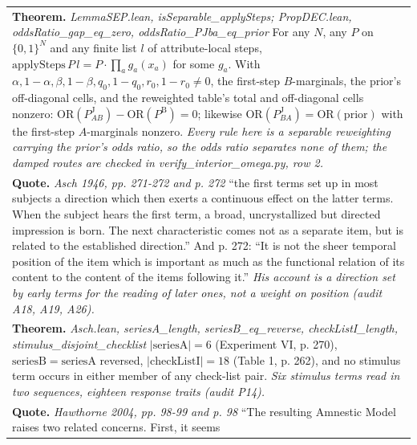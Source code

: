 \documentclass[10pt]{article}
\theoremstyle{definition}
\newcommand{\PB}{P^{\mathrm{B}}}
\newcommand{\PJ}{P^{\mathrm{J}}}
\newlength{\fullw}\setlength{\fullw}{25.9cm}
\begin{document}
{\begin{longtable}{|p{0.9cm}|p{12.2cm}|p{12.2cm}|}
\multicolumn{3}{|p{\fullw}|}{\textbf{Theorem.} \textit{LemmaSEP.lean, isSeparable\_applySteps; PropDEC.lean, oddsRatio\_gap\_eq\_zero, oddsRatio\_PJba\_eq\_prior} \newline For any $N$, any $P$ on $\{0,1\}^N$ and any finite list $l$ of attribute-local
steps, $\mathrm{applySteps}\,P\,l=P\cdot\prod_a g_a(x_a)$ for some $g_a$. With
$\alpha,1-\alpha,\beta,1-\beta,q_0,1-q_0,r_0,1-r_0\neq0$, the first-step $B$-marginals,
the prior's off-diagonal cells, and the reweighted table's total and off-diagonal
cells nonzero: $\mathrm{OR}(\PJ_{AB})-\mathrm{OR}(\PB)=0$; likewise
$\mathrm{OR}(\PJ_{BA})=\mathrm{OR}(\mathrm{prior})$ with the first-step $A$-marginals
nonzero. \newline \textit{Every rule here is a separable reweighting carrying the prior's odds ratio, so the odds ratio separates none of them; the damped routes are checked in verify\_interior\_omega.py, row 2.}} \\
\multicolumn{3}{|p{\fullw}|}{\textbf{Quote.} \textit{Asch 1946, pp. 271-272 and p. 272} \newline ``the first terms set up in most subjects a direction which then exerts a
continuous effect on the latter terms. When the subject hears the first term, a
broad, uncrystallized but directed impression is born. The next characteristic comes
not as a separate item, but is related to the established direction.'' And p. 272:
``It is not the sheer temporal position of the item which is important as much as
the functional relation of its content to the content of the items following it.'' \newline \textit{His account is a direction set by early terms for the reading of later ones, not a weight on position (audit A18, A19, A26).}} \\
\multicolumn{3}{|p{\fullw}|}{\textbf{Theorem.} \textit{Asch.lean, seriesA\_length, seriesB\_eq\_reverse, checkListI\_length, stimulus\_disjoint\_checklist} \newline $|\mathrm{seriesA}|=6$ (Experiment VI, p. 270), $\mathrm{seriesB}=\mathrm{seriesA}$
reversed, $|\mathrm{checkListI}|=18$ (Table 1, p. 262), and no stimulus term occurs in
either member of any check-list pair. \newline \textit{Six stimulus terms read in two sequences, eighteen response traits (audit P14).}} \\
\multicolumn{3}{|p{\fullw}|}{\textbf{Quote.} \textit{Hawthorne 2004, pp. 98-99 and p. 98} \newline ``The resulting Amnestic Model raises two related concerns. First, it seems
}
\end{longtable}}
\end{document}
